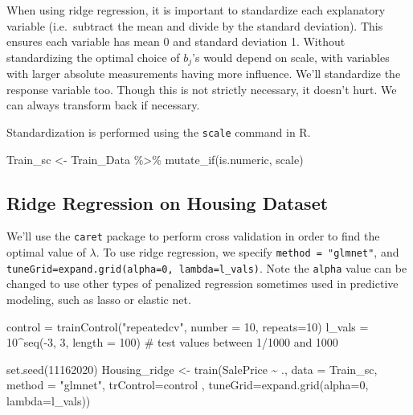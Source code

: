 \documentclass[
  letterpaper,
  DIV=11,
  numbers=noendperiod]{scrreprt}
\newenvironment{Shaded}{\begin{snugshade}}{\end{snugshade}}
\newcommand{\AttributeTok}[1]{\textcolor[rgb]{0.40,0.45,0.13}{#1}}
\newcommand{\CommentTok}[1]{\textcolor[rgb]{0.37,0.37,0.37}{#1}}
\newcommand{\DecValTok}[1]{\textcolor[rgb]{0.68,0.00,0.00}{#1}}
\newcommand{\FunctionTok}[1]{\textcolor[rgb]{0.28,0.35,0.67}{#1}}
\newcommand{\NormalTok}[1]{\textcolor[rgb]{0.00,0.23,0.31}{#1}}
\newcommand{\OtherTok}[1]{\textcolor[rgb]{0.00,0.23,0.31}{#1}}
\newcommand{\SpecialCharTok}[1]{\textcolor[rgb]{0.37,0.37,0.37}{#1}}
\newcommand{\StringTok}[1]{\textcolor[rgb]{0.13,0.47,0.30}{#1}}
\begin{document}
When using ridge regression, it is important to standardize each
explanatory variable (i.e.~subtract the mean and divide by the standard
deviation). This ensures each variable has mean 0 and standard deviation
1. Without standardizing the optimal choice of \(b_j\)'s would depend on
scale, with variables with larger absolute measurements having more
influence. We'll standardize the response variable too. Though this is
not strictly necessary, it doesn't hurt. We can always transform back if
necessary.

Standardization is performed using the \texttt{scale} command in R.

\begin{Shaded}
\begin{Highlighting}[]
\NormalTok{Train\_sc }\OtherTok{\textless{}{-}}\NormalTok{ Train\_Data }\SpecialCharTok{\%\textgreater{}\%} \FunctionTok{mutate\_if}\NormalTok{(is.numeric, scale)}
\end{Highlighting}
\end{Shaded}

\subsection{Ridge Regression on Housing
Dataset}\label{ridge-regression-on-housing-dataset}

We'll use the \texttt{caret} package to perform cross validation in
order to find the optimal value of \(\lambda\). To use ridge regression,
we specify \texttt{method\ =\ "glmnet"}, and
\texttt{tuneGrid=expand.grid(alpha=0,\ lambda=l\_vals)}. Note the
\texttt{alpha} value can be changed to use other types of penalized
regression sometimes used in predictive modeling, such as lasso or
elastic net.

\begin{Shaded}
\begin{Highlighting}[]
\NormalTok{control }\OtherTok{=} \FunctionTok{trainControl}\NormalTok{(}\StringTok{"repeatedcv"}\NormalTok{, }\AttributeTok{number =} \DecValTok{10}\NormalTok{, }\AttributeTok{repeats=}\DecValTok{10}\NormalTok{)}
\NormalTok{l\_vals }\OtherTok{=} \DecValTok{10}\SpecialCharTok{\^{}}\FunctionTok{seq}\NormalTok{(}\SpecialCharTok{{-}}\DecValTok{3}\NormalTok{, }\DecValTok{3}\NormalTok{, }\AttributeTok{length =} \DecValTok{100}\NormalTok{)  }\CommentTok{\# test values between 1/1000 and 1000}

\FunctionTok{set.seed}\NormalTok{(}\DecValTok{11162020}\NormalTok{)}
\NormalTok{Housing\_ridge }\OtherTok{\textless{}{-}} \FunctionTok{train}\NormalTok{(SalePrice }\SpecialCharTok{\textasciitilde{}}\NormalTok{ .,}
                       \AttributeTok{data =}\NormalTok{ Train\_sc, }\AttributeTok{method =} \StringTok{"glmnet"}\NormalTok{, }\AttributeTok{trControl=}\NormalTok{control , }
                      \AttributeTok{tuneGrid=}\FunctionTok{expand.grid}\NormalTok{(}\AttributeTok{alpha=}\DecValTok{0}\NormalTok{, }\AttributeTok{lambda=}\NormalTok{l\_vals))}
\end{Highlighting}
\end{Shaded}
\end{document}
